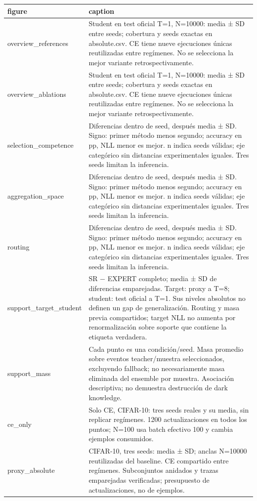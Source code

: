 \begin{tabular}{ll}
\toprule
figure & caption \\
\midrule
overview\_references & Student en test oficial T=1, N=10000: media ± SD entre seeds; cobertura y seeds exactas en absolute.csv. CE tiene nueve ejecuciones únicas reutilizadas entre regímenes. No se selecciona la mejor variante retrospectivamente. \\
overview\_ablations & Student en test oficial T=1, N=10000: media ± SD entre seeds; cobertura y seeds exactas en absolute.csv. CE tiene nueve ejecuciones únicas reutilizadas entre regímenes. No se selecciona la mejor variante retrospectivamente. \\
selection\_competence & Diferencias dentro de seed, después media ± SD. Signo: primer método menos segundo; accuracy en pp, NLL menor es mejor. n indica seeds válidas; eje categórico sin distancias experimentales iguales. Tres seeds limitan la inferencia. \\
aggregation\_space & Diferencias dentro de seed, después media ± SD. Signo: primer método menos segundo; accuracy en pp, NLL menor es mejor. n indica seeds válidas; eje categórico sin distancias experimentales iguales. Tres seeds limitan la inferencia. \\
routing & Diferencias dentro de seed, después media ± SD. Signo: primer método menos segundo; accuracy en pp, NLL menor es mejor. n indica seeds válidas; eje categórico sin distancias experimentales iguales. Tres seeds limitan la inferencia. \\
support\_target\_student & SR − EXPERT completo; media ± SD de diferencias emparejadas. Target: proxy a T=8; student: test oficial a T=1. Sus niveles absolutos no definen un gap de generalización. Routing y masa previa compartidos; target NLL no aumenta por renormalización sobre soporte que contiene la etiqueta verdadera. \\
support\_mass & Cada punto es una condición/seed. Masa promedio sobre eventos teacher/muestra seleccionados, excluyendo fallback; no necesariamente masa eliminada del ensemble por muestra. Asociación descriptiva; no demuestra destrucción de dark knowledge. \\
ce\_only & Solo CE, CIFAR-10: tres seeds reales y su media, sin replicar regímenes. 1200 actualizaciones en todos los puntos; N=100 usa batch efectivo 100 y cambia ejemplos consumidos. \\
proxy\_absolute & CIFAR-10, tres seeds: media ± SD; anclas N=10000 reutilizadas del baseline. CE compartido entre regímenes. Subconjuntos anidados y trazas emparejadas verificadas; presupuesto de actualizaciones, no de ejemplos. \\

\end{tabular}
